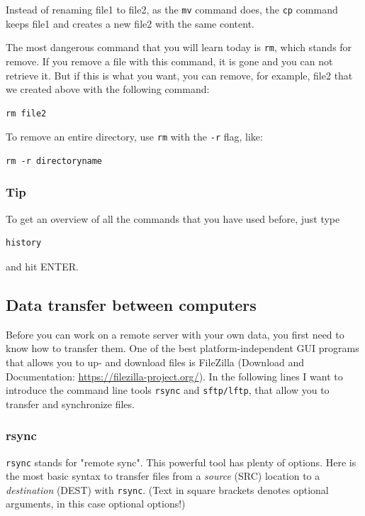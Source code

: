 \documentclass[11pt]{article}
\begin{document}
Instead of renaming file1 to file2, as the \texttt{mv} command does, the \texttt{cp}
command keeps file1 and creates a new file2 with the same content.

The most dangerous command that you will learn today is \texttt{rm}, which stands
for remove. If you remove a file with this command, it is gone and you
can not retrieve it. But if this is what you want, you can remove, for
example, file2 that we created above with the following command:


\begin{verbatim}
rm file2
\end{verbatim}

To remove an entire directory, use \texttt{rm} with the \texttt{-r} flag, like:

\begin{verbatim}
rm -r directoryname
\end{verbatim}

\subsubsection{Tip}
\label{sec:orgheadline9}
To get an overview of all the commands that you have used before, just
type


\begin{verbatim}
history
\end{verbatim}

and hit ENTER.

\subsection{Data transfer between computers}
\label{sec:orgheadline14}
Before you can work on a remote server with your own data, you first
need to know how to transfer them.  One of the best
platform-independent GUI programs that allows you to up- and download
files is FileZilla (Download and Documentation:
\url{https://filezilla-project.org/}). In the following lines I want to
introduce the command line tools \texttt{rsync} and \texttt{sftp/lftp}, that allow
you to transfer and synchronize files.
\subsubsection{rsync}
\label{sec:orgheadline11}


\texttt{rsync} stands for "remote sync". This powerful tool has plenty of
options.  Here is the most basic syntax to transfer files from a
\emph{source} (SRC) location to a \emph{destination} (DEST) with \texttt{rsync}. (Text
in square brackets denotes optional arguments, in this case optional
options!)
\end{document}
